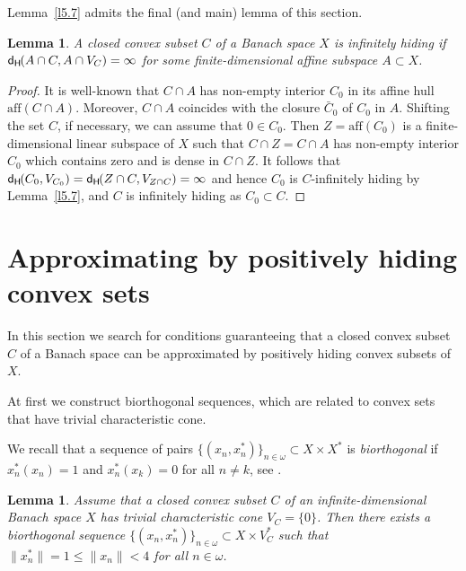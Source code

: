 \documentclass{amsart}
\newcommand{\w}{\omega}
\newcommand{\aff}{\mathrm{aff}}
\newcommand{\dH}{\mathsf{d}_{\mathsf H}\kern-1pt}
\newtheorem{lemma}[theorem]{Lemma}
\theoremstyle{definition}
\begin{document}
Lemma~\ref{l5.7} admits the final (and main) lemma of this section.

\begin{lemma}\label{l5.8} A closed convex subset $C$ of a Banach space $X$ is infinitely hiding if  $\dH(A\cap C,A\cap V_C)=\infty$ for some finite-dimensional affine subspace $A\subset X$.
\end{lemma}

\begin{proof} It is well-known that $C\cap A$ has non-empty interior $C_0$ in its affine hull $\aff(C\cap A)$. Moreover, $C\cap A$ coincides with the closure $\bar C_0$ of $C_0$ in $A$.
Shifting the set $C$, if necessary, we can assume that $0\in C_0$. Then $Z=\aff(C_0)$ is a finite-dimensional linear subspace of $X$ such that $C\cap Z=C\cap A$ has non-empty interior $C_0$ which contains zero and is dense in $C\cap Z$. It follows that $\dH(C_0,V_{C_0})=\dH(Z\cap C,V_{Z\cap C})=\infty$ and hence $C_0$ is $C$-infinitely hiding by Lemma~\ref{l5.7}, and $C$ is infinitely hiding as $C_0\subset C$.
\end{proof}




\section{Approximating by positively hiding convex sets}\label{s6}

In this section we search for conditions guaranteeing that a closed convex subset $C$ of a Banach space can be approximated by positively hiding convex subsets of $X$.

At first we construct biorthogonal sequences, which are related to convex sets that have trivial characteristic cone.

We recall that a sequence of pairs $\{(x_n,x^*_n)\}_{n\in \w}\subset X\times X^*$ is {\em  biorthogonal} if $x^*_n(x_n)=1$ and $x^*_n(x_k)=0$ for all $n\ne k$, see \cite[1.1]{HMVZ}.


\begin{lemma}\label{l6.1}  Assume that a closed convex subset $C$ of an infinite-dimensional Banach space $X$ has trivial characteristic cone $V_C=\{0\}$. Then there exists a biorthogonal sequence $\{(x_n,x_n^*)\}_{n\in\w}\subset X\times V^*_C$ such that $\|x^*_n\|=1\le \|x_n\|<4$ for all $n\in\w$.
\end{lemma}
\end{document}
